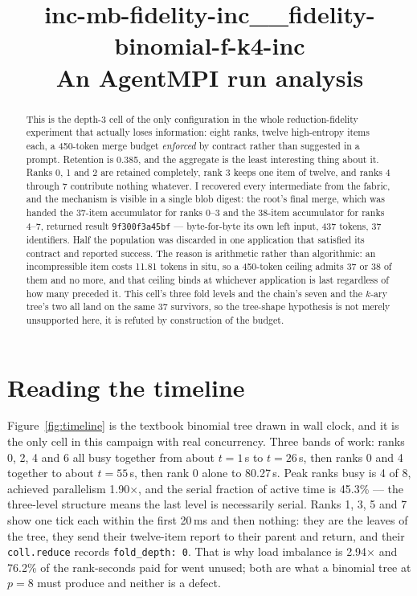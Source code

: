 \documentclass[11pt]{article}
\title{\textbf{inc-mb-fidelity-inc\_\_fidelity-binomial-f-k4-inc}\\[2pt]\large An AgentMPI run analysis}
\author{}
\date{}
\begin{document}
\maketitle

\begin{abstract}
This is the depth-3 cell of the only configuration in the whole reduction-fidelity
experiment that actually loses information: eight ranks, twelve high-entropy items each,
a 450-token merge budget \emph{enforced} by contract rather than suggested in a prompt.
Retention is 0.385, and the aggregate is the least interesting thing about it. Ranks 0, 1
and 2 are retained completely, rank 3 keeps one item of twelve, and ranks 4 through 7
contribute nothing whatever. I recovered every intermediate from the fabric, and the
mechanism is visible in a single blob digest: the root's final merge, which was handed the
37-item accumulator for ranks 0--3 and the 38-item accumulator for ranks 4--7, returned
result \texttt{9f300f3a45bf} --- byte-for-byte its own left input, 437 tokens, 37
identifiers. Half the population was discarded in one application that satisfied its
contract and reported success. The reason is arithmetic rather than algorithmic: an
incompressible item costs 11.81 tokens in situ, so a 450-token ceiling admits 37 or 38 of
them and no more, and that ceiling binds at whichever application is last regardless of
how many preceded it. This cell's three fold levels and the chain's seven and the $k$-ary
tree's two all land on the same 37 survivors, so the tree-shape hypothesis is not merely
unsupported here, it is refuted by construction of the budget.
\end{abstract}



\section{Reading the timeline}

Figure~\ref{fig:timeline} is the textbook binomial tree drawn in wall clock, and it is the
only cell in this campaign with real concurrency. Three bands of work: ranks 0, 2, 4 and 6
all busy together from about $t = 1$\,s to $t = 26$\,s, then ranks 0 and 4 together to
about $t = 55$\,s, then rank 0 alone to 80.27\,s. Peak ranks busy is 4 of 8, achieved
parallelism 1.90$\times$, and the serial fraction of active time is 45.3\% --- the
three-level structure means the last level is necessarily serial. Ranks 1, 3, 5 and 7 show
one tick each within the first 20\,ms and then nothing: they are the leaves of the tree,
they send their twelve-item report to their parent and return, and their
\texttt{coll.reduce} records \texttt{fold\_depth: 0}. That is why load imbalance is
2.94$\times$ and 76.2\% of the rank-seconds paid for went unused; both are what a binomial
tree at $p=8$ must produce and neither is a defect.
\end{document}
